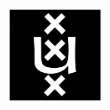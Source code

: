 \begin{titlepage}
\includegraphics[width=2.5cm]{figures/uva-logo.jpg}\\ %
\textsc{\large {}}\\[1.0cm] %
 

\vfill %

\end{titlepage}

